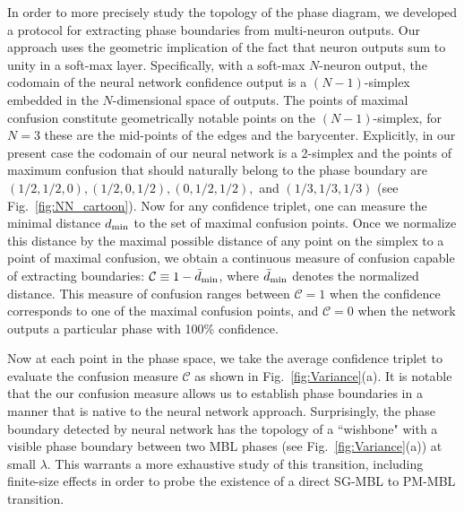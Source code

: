 \documentclass[amsmath,amssymb, aps, prb, superscriptaddress,twocolumn]{revtex4-1}
\begin{document}
In order to more precisely study the topology of the phase diagram, we developed a protocol for extracting phase boundaries from multi-neuron outputs. Our approach uses the geometric implication of the fact that neuron outputs sum to unity in a soft-max layer. Specifically, with a soft-max $N$-neuron output, the codomain of the neural network confidence output is a $(N-1)$-simplex embedded in the $N$-dimensional space of outputs.  The points of maximal confusion constitute geometrically notable points on the $(N-1)$-simplex, for $N=3$ these are the mid-points of the edges and the barycenter. 
Explicitly, in our present case the codomain of our neural network is a 2-simplex and the points of maximum confusion that should naturally belong to the phase boundary\cite{Melko2017} are $(1/2, 1/2, 0), (1/2, 0, 1/2), (0, 1/2, 1/2),$ and $(1/3, 1/3, 1/3)$ (see Fig.~\ref{fig:NN_cartoon}). Now for any confidence triplet, one can measure the minimal distance  $d_{\rm min}$ to the set of maximal confusion points. Once we normalize this distance by the maximal possible distance of any point on the simplex to a point of maximal confusion, we obtain 
a continuous measure of confusion capable of extracting boundaries: ${\mathcal{C}}\equiv 1-\bar{d}_{\rm min}$, where $\bar{d}_{\rm min}$ denotes the normalized distance. This measure of confusion ranges between $\mathcal{C}=1$ when the confidence corresponds to one of the maximal confusion points, and $\mathcal{C}=0$ when  
the network outputs a particular phase with 100\% confidence. 

Now at each point in the phase space, we take the average confidence triplet to evaluate the confusion measure $\mathcal{C}$ as shown in Fig.~\ref{fig:Variance}(a). It is notable that the our confusion measure allows us to establish phase boundaries in a manner that is native to the neural network approach. 
Surprisingly, the phase boundary detected by neural network has the topology of a ``wishbone" with a visible phase boundary between two MBL phases (see Fig.~\ref{fig:Variance}(a)) at small $\lambda$. 
This warrants a more exhaustive study of this transition, including finite-size effects in order to probe the existence of a direct SG-MBL to PM-MBL transition.
\end{document}
